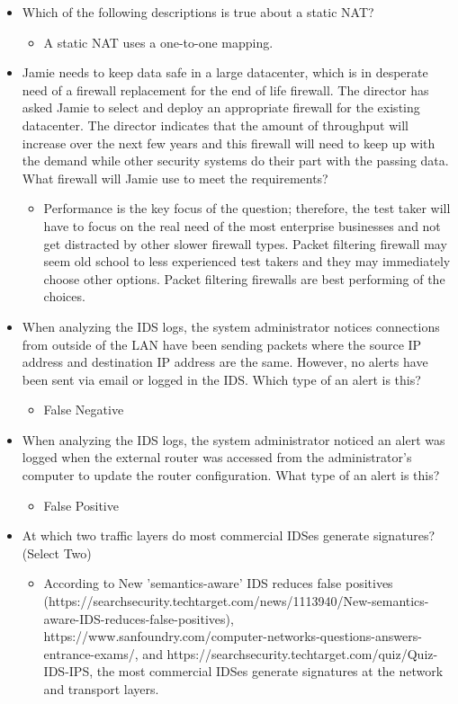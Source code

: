 \begin{itemize}
\begin{itemize}
    \end{itemize}
    \item Which of the following descriptions is true about a static NAT?
    \begin{itemize}
        \item A static NAT uses a one-to-one mapping.
    \end{itemize}
    \item Jamie needs to keep data safe in a large datacenter, which is in desperate need of a firewall replacement for the end of life firewall. The director has asked Jamie to select and deploy an appropriate firewall for the existing datacenter. The director indicates that the amount of throughput will increase over the next few years and this firewall will need to keep up with the demand while other security systems do their part with the passing data. What firewall will Jamie use to meet the requirements?
    \begin{itemize}
        \item Performance is the key focus of the question; therefore, the test taker will have to focus on the real need of the most enterprise businesses and not get distracted by other slower firewall types. Packet filtering firewall may seem old school to less experienced test takers and they may immediately choose other options.
        Packet filtering firewalls are best performing of the choices.
    \end{itemize}
    \item When analyzing the IDS logs, the system administrator notices connections from outside of the LAN have been sending packets where the source IP address and destination IP address are the same. However, no alerts have been sent via email or logged in the IDS. Which type of an alert is this?
    \begin{itemize}
        \item False Negative
    \end{itemize}
    \item When analyzing the IDS logs, the system administrator noticed an alert was logged when the external router was accessed from the administrator’s computer to update the router configuration. What type of an alert is this?
    \begin{itemize}
        \item False Positive
    \end{itemize}
    \item At which two traffic layers do most commercial IDSes generate signatures? (Select Two)
    \begin{itemize}
        \item According to New 'semantics-aware' IDS reduces false positives (https://searchsecurity.techtarget.com/news/1113940/New-semantics-aware-IDS-reduces-false-positives), https://www.sanfoundry.com/computer-networks-questions-answers-entrance-exams/, and https://searchsecurity.techtarget.com/quiz/Quiz-IDS-IPS, the most commercial IDSes generate signatures at the network and transport layers.
    \end{itemize}
\end{itemize}
